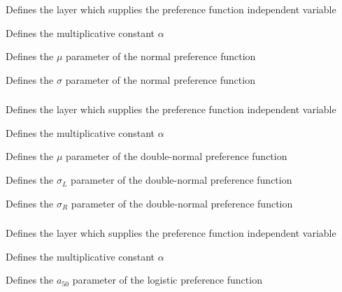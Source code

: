  {Defines the layer which supplies the preference function independent variable}

 {Defines the multiplicative constant $\alpha$}

 {Defines the $\mu$ parameter of the normal preference function}

 {Defines the $\sigma$ parameter of the normal preference function}

\subsubsection[Double-normal]{}

 {Defines the layer which supplies the preference function independent variable}

 {Defines the multiplicative constant $\alpha$}

 {Defines the $\mu$ parameter of the double-normal preference function}

 {Defines the $\sigma_L$ parameter of the double-normal preference function}

 {Defines the $\sigma_R$ parameter of the double-normal preference function}

\subsubsection[Logistic]{}

 {Defines the layer which supplies the preference function independent variable}

 {Defines the multiplicative constant $\alpha$}

 {Defines the $a_{50}$ parameter of the logistic preference function}

